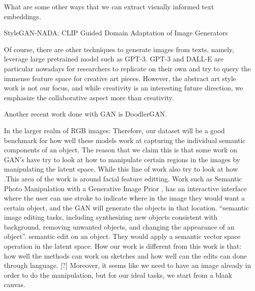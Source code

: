 What are some other ways that we can extract visually informed text embeddings. 

StyleGAN-NADA: CLIP Guided Domain Adaptation of Image Generators

Of course, there are other techniques to generate images from texts, namely, leverage large pretrained model such as GPT-3. GPT-3 and DALL-E are particular nowadays for researchers to replicate on their own and try to query the immense feature space for creative art pieces. However, the abstract art style work is not our focus, and while creativity is an interesting future direction, we emphasize the collaborative aspect more than creativity. 

Another recent work done with GAN is DoodlerGAN.  

In the larger realm of RGB images:
Therefore, our dataset will be a good benchmark for how well these models work at capturing the individual semantic components of an object. The reason that we claim this is that some work on GAN's have try to look at how to manipulate certain regions in the images by manipulating the latent space. While this line of work also try to look at how .This area of the work is around facial feature editting. Work such as Semantic Photo Manipulation with a Generative Image Prior \citep{Bau:Ganpaint:2019}, has an interactive interface where the user can use stroke to indicate where in the image they would want a certain object, and the GAN will generate the objects in that location. ``semantic image editing tasks, including synthesizing new objects consistent with background, removing unwanted objects, and changing the appearance of an object''. semantic edit on an object. They would apply a semantic vector space operation in the latent space. How our work is different from this work is that: how well the methods can work on sketches and how well can the edits can done through language. [?] Moreover, it seems like we need to have an image already in order to do the manipulation, but for our ideal tasks, we start from a blank canvas.

